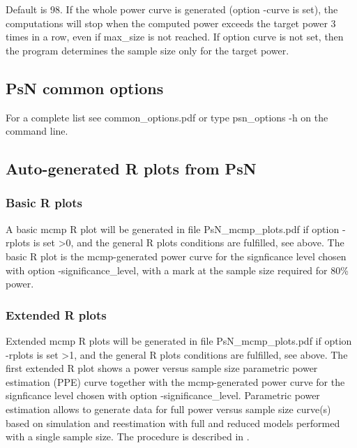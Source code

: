 \begin{optionlist}
\nextopt
{}
Default is 98. If the whole power curve is generated (option -curve is set), the computations will stop when the computed power exceeds the target power 3 times in a row, even if max\_size is not reached. If option curve is not set, then the program determines the sample size only for the target power. 
\nextopt
\end{optionlist}

\subsection{PsN common options}
For a complete list see common\_options.pdf or type psn\_options -h on the command line.

\subsection{Auto-generated R plots from PsN}
\newcommand{\rplotsconditions}{The default mcmp template requires the R libraries ggplot2 and plyr.
If the packages are not installed no pdf will be generated, see the .Rout file in the main run directory for error messages.}


\subsubsection*{Basic R plots}
A basic mcmp R plot will be generated in file PsN\_mcmp\_plots.pdf if option -rplots is set >0, and the general R plots conditions are fulfilled, see above.
The basic R plot is the mcmp-generated power curve for the signficance level chosen with option -significance\_level, with a mark at the sample size required for 80\% power.
\subsubsection*{Extended R plots}
Extended mcmp R plots will be generated in file PsN\_mcmp\_plots.pdf if option -rplots is set >1, and the general R plots conditions are fulfilled, see above.
The first extended R plot shows a power versus sample size parametric power estimation (PPE) curve together with the mcmp-generated power curve for the signficance level chosen with option -significance\_level. Parametric power estimation allows to generate data for full power versus sample size curve(s) based on simulation and reestimation with full and reduced models performed with a single sample size.
The procedure is described in \cite{Ueckert}. 

